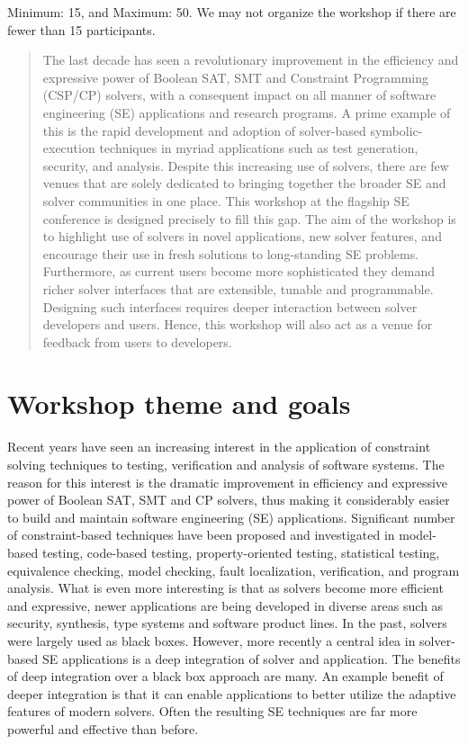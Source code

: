\documentclass{sig-alternate}
\begin{document}
Minimum: 15, and Maximum: 50. We may not organize the workshop if
there are fewer than 15 participants.
\vspace{0.2cm}

\begin{abstract}
\vspace{0.2cm}
The last decade has seen a revolutionary improvement in the efficiency
and expressive power of Boolean SAT, SMT and Constraint Programming
(CSP/CP) solvers, with a consequent impact on all manner of software
engineering (SE) applications and research programs. A prime example
of this is the rapid development and adoption of solver-based
symbolic-execution techniques in myriad applications such as test
generation, security, and analysis. Despite this increasing use of
solvers, there are few venues that are solely dedicated to bringing
together the broader SE and solver communities in one place. This
workshop at the flagship SE conference is designed precisely to fill
this gap. The aim of the workshop is to highlight use of solvers in
novel applications, new solver features, and encourage their use in
fresh solutions to long-standing SE problems. Furthermore, as current
users become more sophisticated they demand richer solver interfaces
that are extensible, tunable and programmable. Designing such
interfaces requires deeper interaction between solver developers and
users. Hence, this workshop will also act as a venue for feedback from
users to developers.

\end{abstract}

\section{Workshop theme and goals}
\vspace{0.2cm} Recent years have seen an increasing interest in the
application of constraint solving techniques to testing, verification
and analysis of software systems. The reason for this interest is the
dramatic improvement in efficiency and expressive power of Boolean
SAT, SMT and CP solvers, thus making it considerably easier to build
and maintain software engineering (SE) applications. Significant
number of constraint-based techniques have been proposed and
investigated in model-based testing, code-based testing,
property-oriented testing, statistical testing, equivalence checking,
model checking, fault localization, verification, and program
analysis.  What is even more interesting is that as solvers become
more efficient and expressive, newer applications are being developed
in diverse areas such as security, synthesis, type systems and
software product lines. In the past, solvers were largely used as
black boxes. However, more recently a central idea in solver-based SE
applications is a deep integration of solver and application. The
benefits of deep integration over a black box approach are many. An
example benefit of deeper integration is that it can enable
applications to better utilize the adaptive features of modern
solvers. Often the resulting SE techniques are far more powerful and
effective than before.
\end{document}
